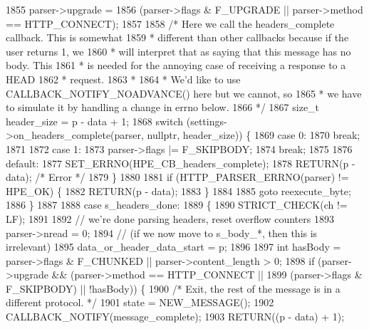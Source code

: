 \begin{DoxyCode}
1855         parser->upgrade =
1856             (parser->flags & F_UPGRADE || parser->method == HTTP_CONNECT);
1857 
1858         \textcolor{comment}{/* Here we call the headers\_complete callback. This is somewhat}
1859 \textcolor{comment}{         * different than other callbacks because if the user returns 1, we}
1860 \textcolor{comment}{         * will interpret that as saying that this message has no body. This}
1861 \textcolor{comment}{         * is needed for the annoying case of receiving a response to a HEAD}
1862 \textcolor{comment}{         * request.}
1863 \textcolor{comment}{         *}
1864 \textcolor{comment}{         * We'd like to use CALLBACK\_NOTIFY\_NOADVANCE() here but we cannot, so}
1865 \textcolor{comment}{         * we have to simulate it by handling a change in errno below.}
1866 \textcolor{comment}{         */}
1867         \textcolor{keywordtype}{size\_t} header\_size = p - data + 1;
1868         \textcolor{keywordflow}{switch} (settings->on_headers_complete(parser, \textcolor{keyword}{nullptr}, header\_size)) \{
1869           \textcolor{keywordflow}{case} 0:
1870             \textcolor{keywordflow}{break};
1871 
1872           \textcolor{keywordflow}{case} 1:
1873             parser->flags |= F_SKIPBODY;
1874             \textcolor{keywordflow}{break};
1875 
1876           \textcolor{keywordflow}{default}:
1877             SET_ERRNO(HPE_CB_headers_complete);
1878             RETURN(p - data); \textcolor{comment}{/* Error */}
1879         \}
1880 
1881         \textcolor{keywordflow}{if} (HTTP_PARSER_ERRNO(parser) != HPE_OK) \{
1882           RETURN(p - data);
1883         \}
1884 
1885         \textcolor{keywordflow}{goto} reexecute\_byte;
1886       \}
1887 
1888       \textcolor{keywordflow}{case} s_headers_done:
1889       \{
1890         STRICT_CHECK(ch != LF);
1891 
1892         \textcolor{comment}{// we're done parsing headers, reset overflow counters}
1893         parser->nread = 0;
1894         \textcolor{comment}{// (if we now move to s\_body\_*, then this is irrelevant)}
1895         data\_or\_header\_data\_start = p;
1896 
1897         \textcolor{keywordtype}{int} hasBody = parser->flags & F_CHUNKED || parser->content_length > 0;
1898         \textcolor{keywordflow}{if} (parser->upgrade && (parser->method == HTTP_CONNECT ||
1899                                 (parser->flags & F_SKIPBODY) || !hasBody)) \{
1900           \textcolor{comment}{/* Exit, the rest of the message is in a different protocol. */}
1901           state = NEW_MESSAGE();
1902           CALLBACK_NOTIFY(message\_complete);
1903           RETURN((p - data) + 1);

\end{DoxyCode}
